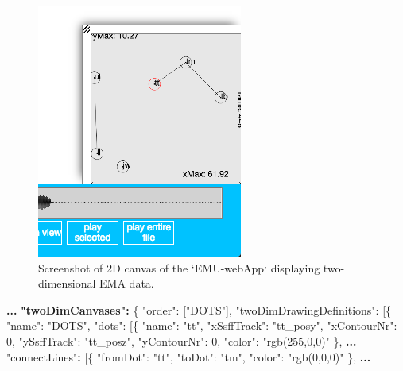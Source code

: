 \documentclass[]{book}
\newenvironment{Shaded}{\begin{snugshade}}{\end{snugshade}}
\newcommand{\DataTypeTok}[1]{\textcolor[rgb]{0.13,0.29,0.53}{#1}}
\newcommand{\DecValTok}[1]{\textcolor[rgb]{0.00,0.00,0.81}{#1}}
\newcommand{\ErrorTok}[1]{\textcolor[rgb]{0.64,0.00,0.00}{\textbf{#1}}}
\newcommand{\FunctionTok}[1]{\textcolor[rgb]{0.00,0.00,0.00}{#1}}
\newcommand{\OtherTok}[1]{\textcolor[rgb]{0.56,0.35,0.01}{#1}}
\newcommand{\StringTok}[1]{\textcolor[rgb]{0.31,0.60,0.02}{#1}}
\begin{document}
\begin{figure}

{\centering \includegraphics[width=0.35\linewidth]{pics/emu-webApp2dCanvas} 

}

\caption{Screenshot of 2D canvas of the `EMU-webApp` displaying two-dimensional EMA data.}\label{fig:webApp-2dCanvas}
\end{figure}

\begin{Shaded}
\begin{Highlighting}[]
\ErrorTok{...}
\ErrorTok{"twoDimCanvases":} \FunctionTok{\{}
    \DataTypeTok{"order"}\FunctionTok{:} \OtherTok{[}\StringTok{"DOTS"}\OtherTok{]}\FunctionTok{,}
    \DataTypeTok{"twoDimDrawingDefinitions"}\FunctionTok{:} \OtherTok{[}\FunctionTok{\{}
        \DataTypeTok{"name"}\FunctionTok{:} \StringTok{"DOTS"}\FunctionTok{,}
        \DataTypeTok{"dots"}\FunctionTok{:} \OtherTok{[}\FunctionTok{\{}
            \DataTypeTok{"name"}\FunctionTok{:} \StringTok{"tt"}\FunctionTok{,}
            \DataTypeTok{"xSsffTrack"}\FunctionTok{:} \StringTok{"tt_posy"}\FunctionTok{,}
            \DataTypeTok{"xContourNr"}\FunctionTok{:} \DecValTok{0}\FunctionTok{,}
            \DataTypeTok{"ySsffTrack"}\FunctionTok{:} \StringTok{"tt_posz"}\FunctionTok{,}
            \DataTypeTok{"yContourNr"}\FunctionTok{:} \DecValTok{0}\FunctionTok{,}
            \DataTypeTok{"color"}\FunctionTok{:} \StringTok{"rgb(255,0,0)"}
        \FunctionTok{\}}\OtherTok{,}
\ErrorTok{...}
    \StringTok{"connectLines"}\ErrorTok{:} \OtherTok{[}\FunctionTok{\{}
        \DataTypeTok{"fromDot"}\FunctionTok{:} \StringTok{"tt"}\FunctionTok{,}
        \DataTypeTok{"toDot"}\FunctionTok{:} \StringTok{"tm"}\FunctionTok{,}
            \DataTypeTok{"color"}\FunctionTok{:} \StringTok{"rgb(0,0,0)"}
    \FunctionTok{\}}\OtherTok{,}
\ErrorTok{...}
\end{Highlighting}
\end{Shaded}
\end{document}
